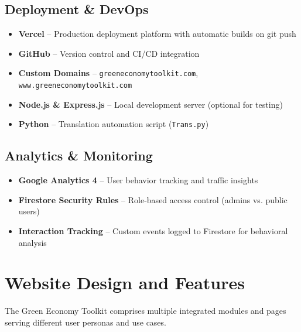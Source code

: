\documentclass[a4paper,12pt]{article}
\begin{document}
\subsection{Deployment \& DevOps}
\begin{itemize}
    \item \textbf{Vercel} – Production deployment platform with automatic builds on git push
    \item \textbf{GitHub} – Version control and CI/CD integration
    \item \textbf{Custom Domains} – \texttt{greeneconomytoolkit.com}, \texttt{www.greeneconomytoolkit.com}
    \item \textbf{Node.js \& Express.js} – Local development server (optional for testing)
    \item \textbf{Python} – Translation automation script (\texttt{Trans.py})
\end{itemize}

\subsection{Analytics \& Monitoring}
\begin{itemize}
    \item \textbf{Google Analytics 4} – User behavior tracking and traffic insights
    \item \textbf{Firestore Security Rules} – Role-based access control (admins vs. public users)
    \item \textbf{Interaction Tracking} – Custom events logged to Firestore for behavioral analysis
\end{itemize}

\section{Website Design and Features}
The Green Economy Toolkit comprises multiple integrated modules and pages serving different user personas and use cases.
\end{document}
